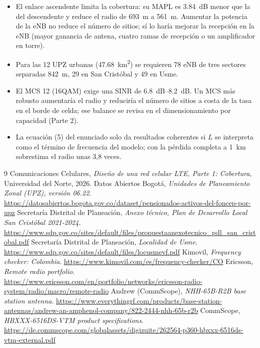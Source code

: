 \documentclass[11pt,letterpaper]{article}
\begin{document}
\begin{itemize}
  \item El enlace ascendente limita la cobertura: su MAPL es \SI{3.84}{dB} menor que la del descendente y reduce el radio de \SI{693}{m} a \SI{561}{m}. Aumentar la potencia de la eNB no reduce el número de sitios; sí lo haría mejorar la recepción en la eNB (mayor ganancia de antena, cuatro ramas de recepción o un amplificador en torre).
  \item Para las 12 UPZ urbanas (\SI{47.68}{km^2}) se requieren 78 eNB de tres sectores separadas \SI{842}{m}, 29 en San Cristóbal y 49 en Usme.
  \item El MCS 12 (16QAM) exige una SINR de \SIrange{6.8}{8.2}{dB}. Un MCS más robusto aumentaría el radio y reduciría el número de sitios a costa de la tasa en el borde de celda; ese balance se revisa en el dimensionamiento por capacidad (Parte 2).
  \item La ecuación (5) del enunciado solo da resultados coherentes si $L$ se interpreta como el término de frecuencia del modelo; con la pérdida completa a \SI{1}{km} sobrestima el radio unas 3,8 veces.
\end{itemize}

\begin{thebibliography}{9}
 Comunicaciones Celulares, \emph{Diseño de una red celular LTE, Parte 1: Cobertura}, Universidad del Norte, 2026.
 Datos Abiertos Bogotá, \emph{Unidades de Planeamiento Zonal (UPZ), versión 06.22}. \url{https://datosabiertos.bogota.gov.co/dataset/pensionados-activos-del-foncep-por-upz}
 Secretaría Distrital de Planeación, \emph{Anexo técnico, Plan de Desarrollo Local San Cristóbal 2021-2024}. \url{https://www.sdp.gov.co/sites/default/files/propuestaanexotecnico_pdl_san_cristobal.pdf}
 Secretaría Distrital de Planeación, \emph{Localidad de Usme}. \url{https://www.sdp.gov.co/sites/default/files/locusmevf.pdf}
 Kimovil, \emph{Frequency checker: Colombia}. \url{https://www.kimovil.com/es/frequency-checker/CO}
 Ericsson, \emph{Remote radio portfolio}. \url{https://www.ericsson.com/en/portfolio/networks/ericsson-radio-system/radio/macro/remote-radio}
 Andrew (CommScope), \emph{NHH-65B-R2B base station antenna}. \url{https://www.everythingrf.com/products/base-station-antennas/andrew-an-amphenol-company/822-2444-nhh-65b-r2b}
 CommScope, \emph{HBXXX-6516DS-VTM product specifications}. \url{https://de.commscope.com/globalassets/digizuite/262564-p360-hbxxx-6516ds-vtm-external.pdf}
\end{thebibliography}
\end{document}
